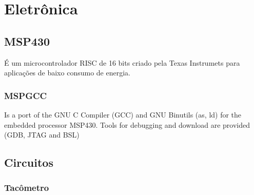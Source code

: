 \chapter{Eletrônica}
\label{eletronica}

\section{MSP430} %
\label{sec:msp430}

É um microcontrolador RISC de 16 bits criado pela Texas Instrumets para aplicações de baixo consumo de energia.



\subsection{MSPGCC} %
\label{sub:mspgcc}

Is a port of the GNU C Compiler (GCC) and GNU Binutils (as, ld) for the embedded processor MSP430. Tools for debugging and download are provided (GDB, JTAG and BSL)


\section{Circuitos} %
\label{sec:circuito}

\subsection{Tacômetro} %
\label{sub:tac_metro}





